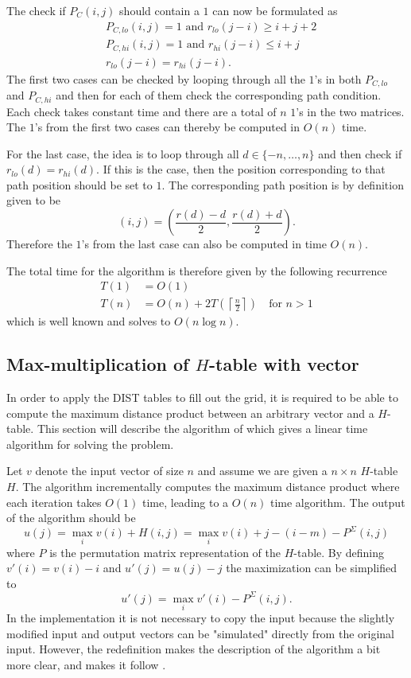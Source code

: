 \documentclass[twoside,11pt,openright]{report}
\begin{document}
%
The check if $P_C(i, j)$ should contain a $1$ can now be formulated as
\begin{align}
  &P_{C,lo}(i, j) = 1 \text{ and } r_{lo}(j - i) \geq i + j + 2 \\
  &P_{C,hi}(i, j) = 1 \text{ and } r_{hi}(j - i) \leq i + j \\
  &r_{lo}(j - i) = r_{hi}(j - i).
\end{align}
The first two cases can be checked by looping through all the $1$'s in both $P_{C,lo}$ and $P_{C,hi}$ and then for each of them check the corresponding path condition. Each check takes constant time and there are a total of $n$ $1$'s in the two matrices. The $1$'s from the first two cases can thereby be computed in $O(n)$ time.

For the last case, the idea is to loop through all $d \in \{-n, \dots, n\}$ and then check if $r_{lo}(d) = r_{hi}(d)$. If this is the case, then the position corresponding to that path position should be set to $1$. The corresponding path position is by definition given to be
\[
  (i, j) = \left( \frac{r(d) - d}{2}, \frac{r(d) + d}{2} \right).
\]
Therefore the $1$'s from the last case can also be computed in time $O(n)$.

The total time for the algorithm is therefore given by the following recurrence
\begin{align*}
  T(1) &= O(1) \\
  T(n) &= O(n) + 2 T\left(\left \lceil \frac{n}{2}\right \rceil \right) \quad \text{for } n > 1
\end{align*}
which is well known and solves to $O(n \log{n})$.

\subsection{Max-multiplication of $H$-table with vector}
\label{sec:algorithm:max-mult-H-table-with-vector}
In order to apply the DIST tables to fill out the grid, it is required to be able to compute the maximum distance product between an arbitrary vector and a $H$-table. This section will describe the algorithm of \cite[Lemma 2, p. 234]{Gawrychowski:2012:FAC:2422024.2422048} which gives a linear time algorithm for solving the problem.

Let $v$ denote the input vector of size $n$ and assume we are given a $n \times n$ $H$-table $H$. The algorithm incrementally computes the maximum distance product where each iteration takes $O(1)$ time, leading to a $O(n)$ time algorithm. The output of the algorithm should be
\[
  u(j) = \max_i v(i) + H(i, j) = \max_i v(i) + j - (i - m) - P^{\Sigma}(i, j)
\]
where $P$ is the permutation matrix representation of the $H$-table. By defining $v'(i) = v(i) - i$ and $u'(j) = u(j) - j$ the maximization can be simplified to
\[
  u'(j) = \max_i v'(i) - P^{\Sigma}(i, j).
\]
In the implementation it is not necessary to copy the input because the slightly modified input and output vectors can be "simulated" directly from the original input. However, the redefinition makes the description of the algorithm a bit more clear, and makes it follow \cite[Lemma 2, p. 234]{Gawrychowski:2012:FAC:2422024.2422048}.
\end{document}
